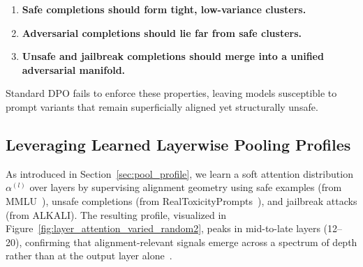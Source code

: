 \begin{enumerate}[leftmargin=1.5em]
    \item \textbf{Safe completions should form tight, low-variance clusters.}
    \item \textbf{Adversarial completions should lie far from safe clusters.}
    \item \textbf{Unsafe and jailbreak completions should merge into a unified adversarial manifold.}
\end{enumerate}

Standard DPO fails to enforce these properties, leaving models susceptible to prompt variants that remain superficially aligned yet structurally unsafe.

\vspace{1mm}
\subsection{Leveraging Learned Layerwise Pooling Profiles}

As introduced in Section~\ref{sec:pool_profile}, we learn a soft attention distribution \(\alpha^{(l)}\) over layers by supervising alignment geometry using safe examples (from MMLU~\cite{hendrycks2021measuring}), unsafe completions (from RealToxicityPrompts~\cite{gehman2020realtoxicityprompts}), and jailbreak attacks (from ALKALI). The resulting profile, visualized in Figure~\ref{fig:layer_attention_varied_random2}, peaks in mid-to-late layers (12--20), confirming that alignment-relevant signals emerge across a spectrum of depth rather than at the output layer alone~\cite{mu2023layers, belrose2023language}.


